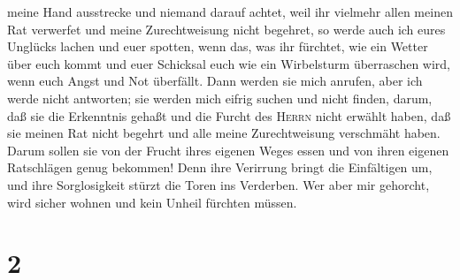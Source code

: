 meine Hand ausstrecke und niemand darauf achtet,  weil
ihr vielmehr allen meinen Rat verwerfet und meine Zurechtweisung nicht
begehret,  so werde auch ich eures Unglücks lachen und
euer spotten,  wenn das, was ihr fürchtet, wie ein Wetter
über euch kommt und euer Schicksal euch wie ein Wirbelsturm überraschen
wird, wenn euch Angst und Not überfällt.  Dann werden sie
mich anrufen, aber ich werde nicht antworten; sie werden mich eifrig
suchen und nicht finden,  darum, daß sie die Erkenntnis
gehaßt und die Furcht des \textsc{Herrn} nicht erwählt haben,
 daß sie meinen Rat nicht begehrt und alle meine
Zurechtweisung verschmäht haben.  Darum sollen sie von
der Frucht ihres eigenen Weges essen und von ihren eigenen Ratschlägen
genug bekommen!  Denn ihre Verirrung bringt die
Einfältigen um, und ihre Sorglosigkeit stürzt die Toren ins Verderben.
 Wer aber mir gehorcht, wird sicher wohnen und kein
Unheil fürchten müssen.

\hypertarget{section-1}{%
\section{2}\label{section-1}}

